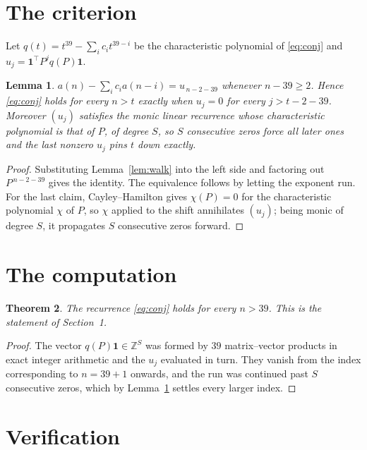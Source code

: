 \documentclass[11pt,a4paper]{article}
\theoremstyle{plain}
\newtheorem{theorem}{Theorem}
\newtheorem{lemma}[theorem]{Lemma}
\theoremstyle{definition}
\begin{document}
\section{The criterion}

Let $q(t)=t^{39}-\sum_i c_i t^{39-i}$ be the characteristic polynomial of
\eqref{eq:conj} and $u_j=\mathbf{1}^{\!\top}P^{j}q(P)\mathbf{1}$.

\begin{lemma}\label{lem:crit}
$a(n)-\sum_i c_i a(n-i)=u_{\,n-2-39}$ whenever $n-39\ge2$. Hence
\eqref{eq:conj} holds for every $n>t$ exactly when $u_j=0$ for every
$j>t-2-39$. Moreover $(u_j)$ satisfies the monic linear recurrence whose
characteristic polynomial is that of $P$, of degree $S$, so $S$ consecutive zeros force all
later ones and the last nonzero $u_j$ pins $t$ down exactly.
\end{lemma}

\begin{proof}
Substituting Lemma~\ref{lem:walk} into the left side and factoring out
$P^{\,n-2-39}$ gives the identity. The equivalence follows by letting the exponent
run. For the last claim, Cayley--Hamilton gives $\chi(P)=0$ for the characteristic
polynomial $\chi$ of $P$, so $\chi$ applied to the shift annihilates $(u_j)$; being monic of
degree $S$, it propagates $S$ consecutive zeros forward.
\end{proof}

\section{The computation}

\begin{theorem}
The recurrence \eqref{eq:conj} holds for every $n>39$. This is the statement of
Section~1.
\end{theorem}

\begin{proof}
The vector $q(P)\mathbf{1}\in\mathbb{Z}^{S}$ was formed by $39$ matrix--vector
products in exact integer arithmetic and the $u_j$ evaluated in turn. They vanish from the
index corresponding to $n=39+1$ onwards, and the run was continued past $S$ consecutive
zeros, which by Lemma~\ref{lem:crit} settles every larger index.
\end{proof}

\section{Verification}
\end{document}
